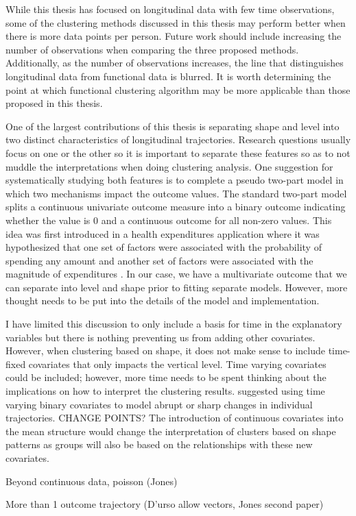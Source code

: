 While this thesis has focused on longitudinal data with few time observations, some of the clustering methods discussed in this thesis may perform better when there is more data points per person. Future work should include increasing the number of observations when comparing the three proposed methods. Additionally, as the number of observations increases, the line that distinguishes longitudinal data from functional data is blurred. It is worth determining the point at which functional clustering algorithm may be more applicable than those proposed in this thesis.

One of the largest contributions of this thesis is separating shape and level into two distinct characteristics of longitudinal trajectories. Research questions usually focus on one or the other so it is important to separate these features so as to not muddle the interpretations when doing clustering analysis. One suggestion for systematically studying both features is to complete a pseudo two-part model in which two mechanisms impact the outcome values. The standard two-part model splits a continuous univariate outcome measure into a binary outcome indicating whether the value is 0 and a continuous outcome for all non-zero values. This idea was first introduced in a health expenditures application where it was hypothesized that one set of factors were associated with the probability of spending any amount and another set of factors were associated with the magnitude of expenditures \cite{HEALTH}. In our case, we have a multivariate outcome that we can separate into level and shape prior to fitting separate models. However, more thought needs to be put into the details of the model and implementation.

I have limited this discussion to only include a basis for time in the explanatory variables but there is nothing preventing us from adding other covariates. However, when clustering based on shape, it does not make sense to include time-fixed covariates that only impacts the vertical level. Time varying covariates could be included; however, more time needs to be spent thinking about the implications on how to interpret the clustering results. \textcite{jones} suggested using time varying binary covariates to model abrupt or sharp changes in individual trajectories. CHANGE POINTS? The introduction of continuous covariates into the mean structure would change the interpretation of clusters based on shape patterns as groups will also be based on the relationships with these new covariates.

Beyond continuous data, poisson (Jones)

More than 1 outcome trajectory (D'urso allow vectors, Jones second paper)



